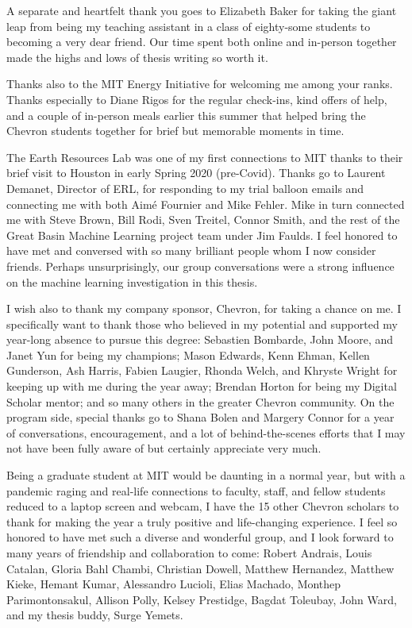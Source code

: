 A separate and heartfelt thank you goes to Elizabeth Baker for taking the giant leap from being my teaching assistant in a class of eighty-some students to becoming a very dear friend. Our time spent both online and in-person together made the highs and lows of thesis writing so worth it.

Thanks also to the MIT Energy Initiative for welcoming me among your ranks. Thanks especially to Diane Rigos for the regular check-ins, kind offers of help, and a couple of in-person meals earlier this summer that helped bring the Chevron students together for brief but memorable moments in time.

The Earth Resources Lab was one of my first connections to MIT thanks to their brief visit to Houston in early Spring 2020 (pre-Covid). Thanks go to Laurent Demanet, Director of ERL, for responding to my trial balloon emails and connecting me with both Aim\'e Fournier and Mike Fehler. Mike in turn connected me with Steve Brown, Bill Rodi, Sven Treitel, Connor Smith, and the rest of the Great Basin Machine Learning project team under Jim Faulds. I feel honored to have met and conversed with so many brilliant people whom I now consider friends. Perhaps unsurprisingly, our group conversations were a strong influence on the machine learning investigation in this thesis.

I wish also to thank my company sponsor, Chevron, for taking a chance on me. I specifically want to thank those who believed in my potential and supported my year-long absence to pursue this degree: Sebastien Bombarde, John Moore, and Janet Yun for being my champions; Mason Edwards, Kenn Ehman, Kellen Gunderson, Ash Harris, Fabien Laugier, Rhonda Welch, and Khryste Wright for keeping up with me during the year away; Brendan Horton for being my Digital Scholar mentor; and so many others in the greater Chevron community. On the program side, special thanks go to Shana Bolen and Margery Connor for a year of conversations, encouragement, and a lot of behind-the-scenes efforts that I may not have been fully aware of but certainly appreciate very much.

Being a graduate student at MIT would be daunting in a normal year, but with a pandemic raging and real-life connections to faculty, staff, and fellow students reduced to a laptop screen and webcam, I have the 15 other Chevron scholars to thank for making the year a truly positive and life-changing experience. I feel so honored to have met such a diverse and wonderful group, and I look forward to many years of friendship and collaboration to come: Robert Andrais, Louis Catalan, Gloria Bahl Chambi, Christian Dowell, Matthew Hernandez, Matthew Kieke, Hemant Kumar, Alessandro Lucioli, Elias Machado, Monthep Parimontonsakul, Allison Polly, Kelsey Prestidge, Bagdat Toleubay, John Ward, and my thesis buddy, Surge Yemets.

